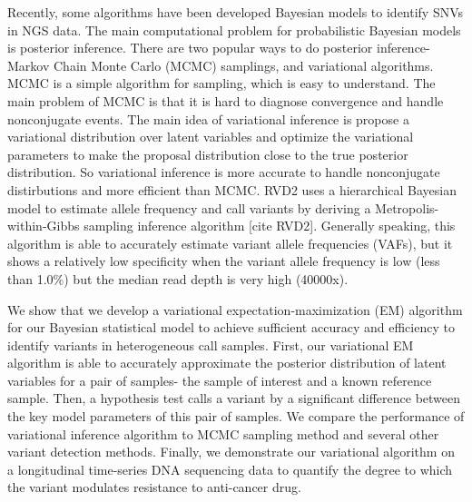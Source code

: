 \documentclass{article}
\begin{document}
Recently, some algorithms have been developed Bayesian models to identify SNVs in NGS data.
The main computational problem for probabilistic Bayesian models is posterior inference.
There are two popular ways to do posterior inference- Markov Chain Monte Carlo (MCMC) samplings, and variational algorithms.
MCMC is a simple algorithm for sampling, which is easy to understand. The main problem of MCMC is that it is hard to diagnose convergence and handle nonconjugate events.
The main idea of variational inference is propose a variational distribution over latent variables and optimize the variational parameters to make the proposal distribution close to the true posterior distribution. 
So variational inference is more accurate to handle nonconjugate distirbutions and more efficient than MCMC. 
RVD2 uses a hierarchical Bayesian model to estimate allele frequency and call variants by deriving a Metropolis-within-Gibbs sampling inference algorithm [cite RVD2].
Generally speaking, this algorithm is able to accurately estimate variant allele frequencies (VAFs), but it shows a relatively low specificity when the variant allele frequency is low (less than 1.0$\%$) but the median read depth is very high (40000x).


We show that we develop a variational expectation-maximization (EM) algorithm for our Bayesian statistical model to achieve sufficient accuracy and efficiency to identify variants in heterogeneous call samples. First, our variational EM algorithm is able to accurately approximate the posterior distribution of latent variables for a pair of samples- the sample of interest and a known reference sample. Then, a hypothesis test calls a variant by a significant difference between the key model parameters of this pair of samples. We compare the performance of variational inference algorithm to MCMC sampling method and several other variant detection methods. Finally, we demonstrate our variational algorithm on a longitudinal time-series DNA sequencing data to quantify the degree to which the variant modulates resistance to anti-cancer drug.
\end{document}
